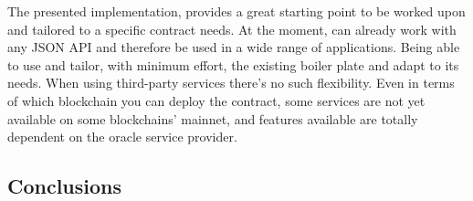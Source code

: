 The presented implementation, provides a great starting point to be worked upon and tailored to a specific contract needs. At the moment, can already work with any JSON API and therefore be used in a wide range of applications. Being able to use and tailor, with minimum effort, the existing boiler plate and adapt to its needs. When using third-party services there's no such flexibility. Even in terms of which blockchain you can deploy the contract, some services are not yet available on some blockchains' mainnet, and features available are totally dependent on the oracle service provider.

\subsection{Conclusions}